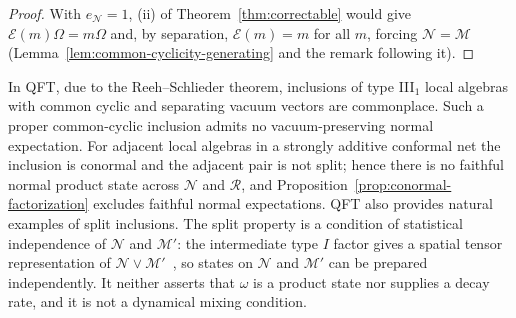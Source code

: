 \documentclass[a4paper,11pt]{article}
\theoremstyle{definition}
\newcommand{\mR}{\mathcal{R}}
\newcommand{\mN}{\mathcal{N}}
\newcommand{\mM}{\mathcal{M}}
\newcommand{\mE}{\mathcal{E}}
\begin{document}
\begin{proof}
With $e_{\mN}=1$, (ii) of Theorem~\ref{thm:correctable} would give $\mE(m)\Omega=m\Omega$ and, by separation, $\mE(m)=m$ for all $m$, forcing $\mN=\mM$ (Lemma~\ref{lem:common-cyclicity-generating} and the remark following it).
\end{proof}


In QFT, due to the Reeh--Schlieder theorem, inclusions of type III$_1$ local algebras with common cyclic and separating vacuum vectors are commonplace. Such a proper common-cyclic inclusion admits no vacuum-preserving normal expectation. For adjacent local algebras in a strongly additive conformal net the inclusion is conormal and the adjacent pair is not split; hence there is no faithful normal product state across $\mN$ and $\mR$, and Proposition~\ref{prop:conormal-factorization} excludes faithful normal expectations. QFT also provides natural examples of split inclusions. The split property is a condition of statistical independence of $\mN$ and $\mM'$: the intermediate type $I$ factor gives a spatial tensor representation of $\mN\vee\mM'$~\cite{standardinclusion}, so states on $\mN$ and $\mM'$ can be prepared independently. It neither asserts that $\omega$ is a product state nor supplies a decay rate, and it is not a dynamical mixing condition.
\end{document}
